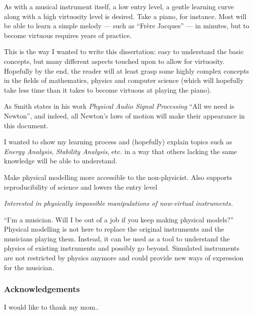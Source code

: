 As with a musical instrument itself, a low entry level, a gentle learning curve along with a high virtuosity level is desired. Take a piano, for instance. Most will be able to learn a simple melody — such as “Fr\`ere Jacques” — in minutes, but to become virtuous requires years of practice.

This is the way I wanted to write this dissertation: easy to understand the basic concepts, but many different aspects touched upon to allow for virtuosity. Hopefully by the end, the reader will at least grasp some highly complex concepts in the fields of mathematics, physics and computer science (which will hopefully take less time than it takes to become virtuous at playing the piano). 

As Smith states in his work \textit{Physical Audio Signal Processing} \cite{Smith2010b} ``All we need is Newton'', and indeed, all Newton's laws of motion will make their appearance in this document.


I wanted to show my learning process and (hopefully) explain topics such as \textit{Energy Analysis}, \textit{Stability Analysis}, etc. in a way that others lacking the same knowledge %
will be able to understand.

Make physical modelling more accessible to the non-physicist. Also supports reproducibility of science and lowers the entry level   


\textit{Interested in physically impossible manipulations of now-virtual instruments.}


 ``I'm a musician. Will I be out of a job if you keep making physical models?'' Physical modelling is not here to replace the original instruments and the musicians playing them. Instead, it can be used as a tool to understand the physics of existing instruments and possibly go beyond. Simulated instruments are not restricted by physics anymore and could provide new ways of expression for the musician.

\subsubsection{Acknowledgements}

I would like to thank my mom..

